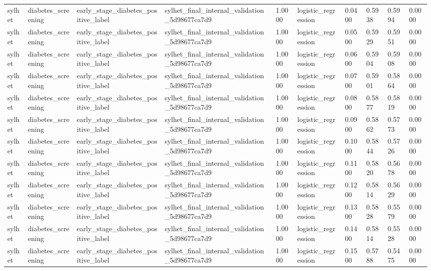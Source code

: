 \begin{tabular}{llllllllll}
sylhet & diabetes\_screening & early\_stage\_diabetes\_positive\_label & sylhet\_final\_internal\_validation\_5d98677ca7d9 & 1.0000 & logistic\_regression & 0.0400 & 0.5938 & 0.5994 & 0.0000 \\
sylhet & diabetes\_screening & early\_stage\_diabetes\_positive\_label & sylhet\_final\_internal\_validation\_5d98677ca7d9 & 1.0000 & logistic\_regression & 0.0500 & 0.5929 & 0.5951 & 0.0000 \\
sylhet & diabetes\_screening & early\_stage\_diabetes\_positive\_label & sylhet\_final\_internal\_validation\_5d98677ca7d9 & 1.0000 & logistic\_regression & 0.0600 & 0.5904 & 0.5908 & 0.0000 \\
sylhet & diabetes\_screening & early\_stage\_diabetes\_positive\_label & sylhet\_final\_internal\_validation\_5d98677ca7d9 & 1.0000 & logistic\_regression & 0.0700 & 0.5901 & 0.5864 & 0.0000 \\
sylhet & diabetes\_screening & early\_stage\_diabetes\_positive\_label & sylhet\_final\_internal\_validation\_5d98677ca7d9 & 1.0000 & logistic\_regression & 0.0800 & 0.5877 & 0.5819 & 0.0000 \\
sylhet & diabetes\_screening & early\_stage\_diabetes\_positive\_label & sylhet\_final\_internal\_validation\_5d98677ca7d9 & 1.0000 & logistic\_regression & 0.0900 & 0.5862 & 0.5773 & 0.0000 \\
sylhet & diabetes\_screening & early\_stage\_diabetes\_positive\_label & sylhet\_final\_internal\_validation\_5d98677ca7d9 & 1.0000 & logistic\_regression & 0.1000 & 0.5844 & 0.5726 & 0.0000 \\
sylhet & diabetes\_screening & early\_stage\_diabetes\_positive\_label & sylhet\_final\_internal\_validation\_5d98677ca7d9 & 1.0000 & logistic\_regression & 0.1100 & 0.5820 & 0.5678 & 0.0000 \\
sylhet & diabetes\_screening & early\_stage\_diabetes\_positive\_label & sylhet\_final\_internal\_validation\_5d98677ca7d9 & 1.0000 & logistic\_regression & 0.1200 & 0.5814 & 0.5629 & 0.0000 \\
sylhet & diabetes\_screening & early\_stage\_diabetes\_positive\_label & sylhet\_final\_internal\_validation\_5d98677ca7d9 & 1.0000 & logistic\_regression & 0.1300 & 0.5828 & 0.5579 & 0.0000 \\
sylhet & diabetes\_screening & early\_stage\_diabetes\_positive\_label & sylhet\_final\_internal\_validation\_5d98677ca7d9 & 1.0000 & logistic\_regression & 0.1400 & 0.5814 & 0.5528 & 0.0000 \\
sylhet & diabetes\_screening & early\_stage\_diabetes\_positive\_label & sylhet\_final\_internal\_validation\_5d98677ca7d9 & 1.0000 & logistic\_regression & 0.1500 & 0.5788 & 0.5475 & 0.0000 \\

\end{tabular}
